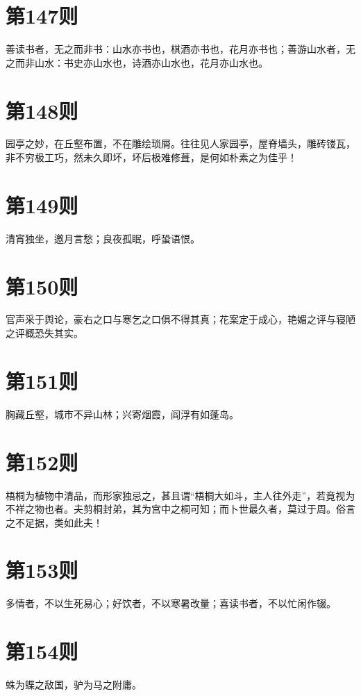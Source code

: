 \documentclass[12pt,a4paper]{ctexbook}
\begin{document}
\section{第147则}
善读书者，无之而非书：山水亦书也，棋酒亦书也，花月亦书也；善游山水者，无之而非山水：书史亦山水也，诗酒亦山水也，花月亦山水也。\par

\section{第148则}
园亭之妙，在丘壑布置，不在雕绘琐屑。往往见人家园亭，屋脊墙头，雕砖镂瓦，非不穷极工巧，然未久即坏，坏后极难修葺，是何如朴素之为佳乎！\par

\section{第149则}
清宵独坐，邀月言愁；良夜孤眠，呼蛩语恨。\par

\section{第150则}
官声采于舆论，豪右之口与寒乞之口俱不得其真；花案定于成心，艳媚之评与寝陋之评概恐失其实。\par

\section{第151则}
胸藏丘壑，城市不异山林；兴寄烟霞，阎浮有如蓬岛。\par

\section{第152则}
梧桐为植物中清品，而形家独忌之，甚且谓“梧桐大如斗，主人往外走”，若竟视为不祥之物也者。夫剪桐封弟，其为宫中之桐可知；而卜世最久者，莫过于周。俗言之不足据，类如此夫！\par

\section{第153则}
多情者，不以生死易心；好饮者，不以寒暑改量；喜读书者，不以忙闲作辍。\par

\section{第154则}
蛛为蝶之敌国，驴为马之附庸。\par
\end{document}
